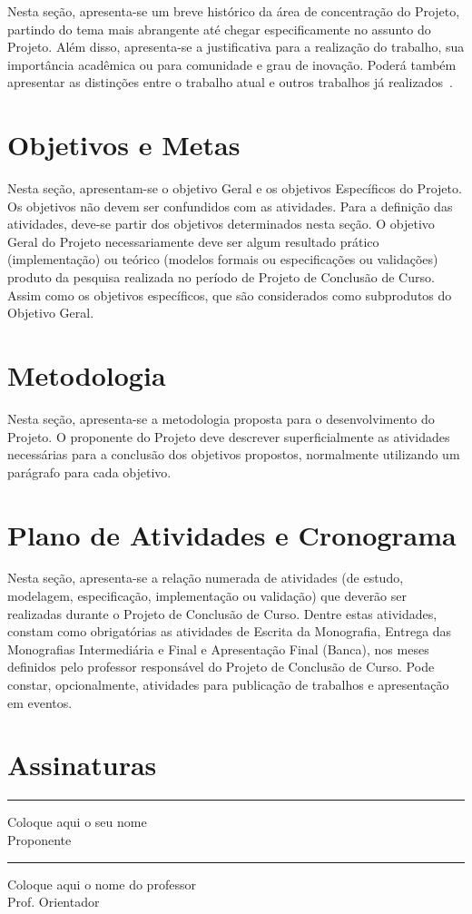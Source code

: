 \documentclass[tcc-proposta]{texufpel}
\begin{document}
Nesta seção, apresenta-se um breve histórico da área de concentração
do Projeto, partindo do tema mais abrangente até chegar
especificamente no assunto do Projeto. Além disso, apresenta-se a
justificativa para a realização do trabalho, sua importância acadêmica
ou para comunidade e grau de inovação. Poderá também apresentar as
distinções entre o trabalho atual e outros trabalhos já
realizados~\cite{vonNeumann:1966:TSR}.

\chapter{Objetivos e Metas}
Nesta seção, apresentam-se o objetivo Geral e os objetivos Específicos
do Projeto. Os objetivos não devem ser confundidos com as
atividades. Para a definição das atividades, deve-se partir dos
objetivos determinados nesta seção. O objetivo Geral do Projeto
necessariamente deve ser algum resultado prático (implementação) ou
teórico (modelos formais ou especificações ou validações) produto da
pesquisa realizada no período de Projeto de Conclusão de Curso. Assim
como os objetivos específicos, que são considerados como subprodutos
do Objetivo Geral.

\chapter{Metodologia}
Nesta seção, apresenta-se a metodologia proposta para o
desenvolvimento do Projeto. O proponente do Projeto deve descrever
superficialmente as atividades necessárias para a conclusão dos
objetivos propostos, normalmente utilizando um parágrafo para cada
objetivo.

\chapter{Plano de Atividades e Cronograma}

Nesta seção, apresenta-se a relação numerada de atividades (de estudo,
modelagem, especificação, implementação ou validação) que deverão ser
realizadas durante o Projeto de Conclusão de Curso. Dentre estas
atividades, constam como obrigatórias as atividades de Escrita da
Monografia, Entrega das Monografias Intermediária e Final e
Apresentação Final (Banca), nos meses definidos pelo professor
responsável do Projeto de Conclusão de Curso. Pode constar,
opcionalmente, atividades para publicação de trabalhos e apresentação
em eventos.




\chapter{Assinaturas}
\vspace{2cm}

\begin{center}
\rule{8cm}{.3mm}
\medskip

	Coloque aqui o seu nome\\
	Proponente

\end{center}

\vspace{4cm}

\begin{center}
\rule{8cm}{.3mm}
\medskip

	Coloque aqui o nome do professor\\
	Prof. Orientador

\end{center}
\end{document}
